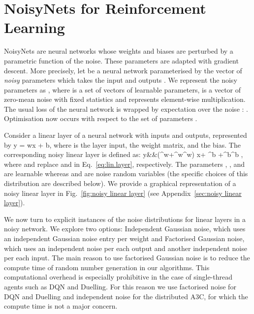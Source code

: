 \documentclass{article}
\begin{document}
\section{NoisyNets for Reinforcement Learning}
\label{sec:noisynets}

NoisyNets are neural networks whose weights and biases are perturbed by a parametric function of the noise. These parameters are adapted with gradient descent. More precisely, let  be a neural network parameterised by the vector of \emph{noisy} parameters  which takes the input  and outputs .  We represent the noisy parameters  as , where   is a set of vectors of learnable parameters,  is a vector of zero-mean noise with fixed statistics and   represents element-wise multiplication. The usual loss of the neural network is wrapped by expectation over the noise : . Optimisation now occurs with respect to the set of parameters .

Consider a linear layer of a neural network with  inputs and  outputs, represented by 
\beq
\label{eq:lin.layer}
y = wx + b,
\eeq
where  is the layer input,  the weight matrix, and  the bias.
The corresponding noisy linear layer is defined as:
\beqa
\label{eq:param}
y&\eqdef&(\mu^w+\sigma^w\odot\eps^w) x+ \mu^b  +\sigma^b\odot\eps^b ,
\eeqa
 where   and  replace  and  in Eq.~\eqref{eq:lin.layer}, respectively.  The parameters , ,  and  are learnable whereas   and  are noise random variables (the specific choices of this distribution are described below). We provide a graphical representation of a noisy linear layer in Fig.~\ref{fig:noisy linear layer} (see Appendix~\ref{sec:noisy linear layer}). 

We now turn to explicit instances of the noise distributions for linear layers in a noisy network. We explore two options: Independent Gaussian noise, which uses an independent Gaussian noise entry per weight and Factorised Gaussian noise, which uses an independent noise per each output and another independent noise per each input. The main reason to use factorised Gaussian noise is to reduce the compute time of random number generation in our algorithms. This computational overhead is especially prohibitive in the case of single-thread agents such as DQN and Duelling. For this reason we use factorised noise for DQN and Duelling and independent noise for the distributed A3C, for which the compute time is not a major concern.
\end{document}
